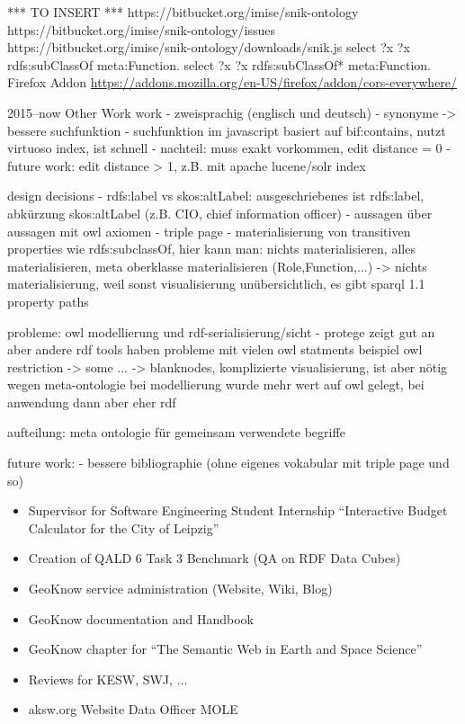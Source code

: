 \documentclass[14pt,aspectratio=1610]{beamer}
\begin{document}
*** TO INSERT ***
https://bitbucket.org/imise/snik-ontology
https://bitbucket.org/imise/snik-ontology/issues
https://bitbucket.org/imise/snik-ontology/downloads/snik.js
select ?x {?x rdfs:subClassOf meta:Function.}
select ?x {?x rdfs:subClassOf* meta:Function.}
Firefox Addon \href{CORS Everywhere}{https://addons.mozilla.org/en-US/firefox/addon/cors-everywhere/}
\begin{frame}{2015--now Other Work}
work
- zweisprachig (englisch und deutsch)
- synonyme -> bessere suchfunktion
- suchfunktion im javascript basiert auf bif:contains, nutzt virtuoso index, ist schnell
- nachteil: muss exakt vorkommen, edit distance = 0
- future work: edit distance > 1, z.B. mit apache lucene/solr index


design decisions
- rdfs:label vs skos:altLabel: ausgeschriebenes ist rdfs:label, abkürzung skos:altLabel (z.B. CIO, chief information officer)
- aussagen über aussagen mit owl axiomen
- triple page
- materialisierung von transitiven properties wie rdfs:subclassOf, hier kann man: nichts materialisieren, alles materialisieren, meta oberklasse materialisieren (Role,Function,...)
-> nichts materialisierung, weil sonst visualisierung unübersichtlich, es gibt sparql 1.1 property paths


probleme:
owl modellierung und rdf-serialisierung/sicht
- protege zeigt gut an aber andere rdf tools haben probleme mit vielen owl statments
beispiel owl restriction -> some ... -> blanknodes, komplizierte visualisierung, ist aber nötig wegen meta-ontologie
bei modellierung wurde mehr wert auf owl gelegt, bei anwendung dann aber eher rdf

aufteilung:
meta ontologie für gemeinsam verwendete begriffe


future work:
- bessere bibliographie (ohne eigenes vokabular mit triple page und so)

\begin{itemize}
\item Supervisor for Software Engineering Student Internship \enquote{Interactive Budget Calculator for the City of Leipzig}
\item Creation of QALD 6 Task 3 Benchmark (QA on RDF Data Cubes)
\item GeoKnow service administration (Website, Wiki, Blog)
\item GeoKnow documentation and Handbook
\item GeoKnow chapter for \enquote{The Semantic Web in Earth and Space Science}
\item Reviews for KESW, SWJ, $\ldots$
\item aksw.org Website Data Officer MOLE
\end{itemize}
\end{frame}
\end{document}
